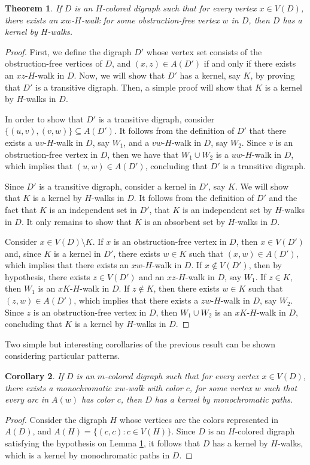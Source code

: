 \documentclass[10pt,a4paper]{article}
\newtheorem{theorem}{Theorem}[section]
\newtheorem{cor}[theorem]{Corollary}
\begin{document}
\begin{theorem}
\label{classlema}
If $D$ is an $H$-colored digraph such that for every vertex $x \in V(D)$, there exists an $xw$-$H$-walk for some obstruction-free vertex $w$ in $D$, then $D$ has a kernel by $H$-walks.
\end{theorem}
\begin{proof}
First, we define the digraph $D'$ whose vertex set consists of the obstruction-free vertices of $D$, and $(x,z) \in A(D')$ if and only if there exists an $xz$-$H$-walk in $D$. Now, we will show that $D'$ has a kernel, say $K$, by proving that $D'$ is a transitive digraph. Then, a simple proof will show that $K$ is a kernel by $H$-walks in $D$.

In order to show that $D'$ is a transitive digraph, consider $\{(u,v), (v,w) \} \subseteq A(D')$. It follows from the definition of $D'$ that there exists a $uv$-$H$-walk in $D$, say $W_{1}$, and a $vw$-$H$-walk in $D$, say $W_{2}$. Since $v$ is an obstruction-free vertex in $D$, then we have that $W_{1} \cup W_{2}$ is a $uw$-$H$-walk in $D$, which implies that $(u,w) \in A(D')$, concluding that $D'$ is a transitive digraph.  

Since $D'$ is a transitive digraph, consider a kernel in $D'$, say $K$. We will show that $K$ is a kernel by $H$-walks in $D$. It follows from the definition of $D'$ and the fact that $K$ is an independent set in $D'$, that $K$ is an independent set by $H$-walks in $D$. It only remains to show that $K$ is an absorbent set by $H$-walks in $D$.

 Consider $x \in V(D)\setminus K$. If $x$ is an obstruction-free vertex in $D$, then $x \in V(D')$ and, since $K$ is a kernel in $D'$, there exists $w \in K$ such that $(x,w) \in A(D')$, which implies that there exists an $xw$-$H$-walk in $D$. If $x \notin V(D')$, then by hypothesis, there exists $z \in V(D')$ and an $xz$-$H$-walk in $D$, say $W_{1}$. If $z \in K$, then $W_{1}$ is an $xK$-$H$-walk in $D$. If $z \notin K$, then there exists $w \in K$ such that $(z,w) \in A(D')$, which implies that there exists a $zw$-$H$-walk in $D$, say $W_{2}$. Since $z$ is an obstruction-free vertex in $D$, then $W_{1} \cup W_{2}$ is an $xK$-$H$-walk in $D$, concluding that $K$ is a kernel by $H$-walks in $D$.
\end{proof}

Two simple but interesting corollaries of the previous result can be shown considering particular patterns.

\begin{cor}
If $D$ is an $m$-colored digraph such that for every vertex $x \in V(D)$, there exists a monochromatic $xw$-walk with color $c$, for some vertex $w$ such that every arc in $A(w)$ has color $c$, then $D$ has a kernel by monochromatic paths.
\end{cor}
\begin{proof}
Consider the digraph $H$ whose vertices are the colors represented in $A(D)$, and $A(H)=\{ (c,c) : c \in V(H) \}$. Since $D$ is an $H$-colored digraph satisfying the hypothesis on Lemma \ref{classlema}, it follows that $D$ has a kernel by $H$-walks, which is a kernel by monochromatic paths in $D$.
\end{proof}
\end{document}
